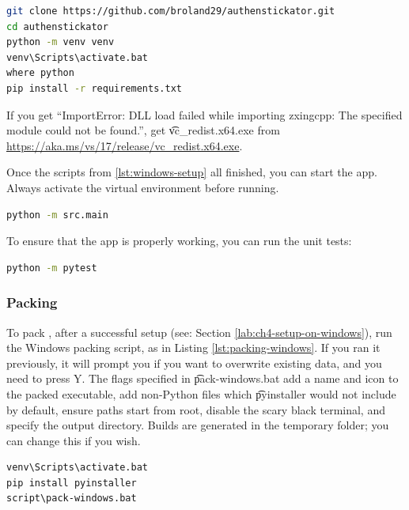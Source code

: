 \begin{lstlisting}[language=bash, label={lst:windows-setup}, caption={Setup commands for Windows.}]
git clone https://github.com/broland29/authenstickator.git
cd authenstickator
python -m venv venv
venv\Scripts\activate.bat
where python
pip install -r requirements.txt
\end{lstlisting}

If you get ``ImportError: DLL load failed while importing zxingcpp: The specified module could not be found.'', get \t{vc\_redist.x64.exe} from \url{https://aka.ms/vs/17/release/vc_redist.x64.exe}.

Once the scripts from \ref{lst:windows-setup} all finished, you can start the app.
Always activate the virtual environment before running.
\begin{lstlisting}[language=bash, label={lst:linux-run-app}, caption={Running the app on Linux.}]
python -m src.main
\end{lstlisting}

To ensure that the app is properly working, you can run the unit tests:
\begin{lstlisting}[language=bash, label={lst:linux-run-tests}, caption={Running the tests on Linux.}]
python -m pytest
\end{lstlisting}



\subsubsection{Packing} \label{lab:ch4-packing-windows}

To pack \app{}, after a successful setup (see: Section \ref{lab:ch4-setup-on-windows}), run the Windows packing script, as in Listing \ref{lst:packing-windows}.
If you ran it previously, it will prompt you if you want to overwrite existing data, and you need to press Y.
The flags specified in \t{pack-windows.bat} add a name and icon to the packed executable, add non-Python files which \t{pyinstaller} would not include by default, ensure paths start from root, disable the scary black terminal, and specify the output directory.
Builds are generated in the temporary folder; you can change this if you wish.

\enlargethispage{-\baselineskip}
\enlargethispage{-\baselineskip}


\begin{lstlisting}[language=bash, label={lst:packing-windows}, caption={Running the packing script for Windows.}]
venv\Scripts\activate.bat
pip install pyinstaller
script\pack-windows.bat
\end{lstlisting}


